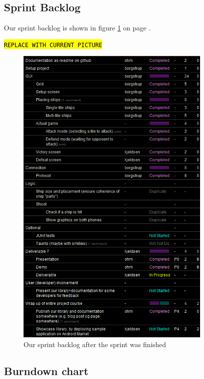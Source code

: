 \documentclass[a4paper,11pt]{article}
\begin{document}
\subsection{Sprint Backlog}
Our sprint backlog is shown in figure \ref{sprintbacklog} on page \pageref{sprintbacklog}.

{ %
\texttt{\hl{REPLACE WITH CURRENT PICTURE}}
}

 \begin{figure}[ht!]
	\begin{center}
 	\includegraphics[width=0.85\textwidth]{sprint_backlog.png}		
 	\end{center}
 	\caption{Our sprint backlog after the sprint was finished}
 	\label{sprintbacklog}
 \end{figure}

\subsection{Burndown chart}
\end{document}
